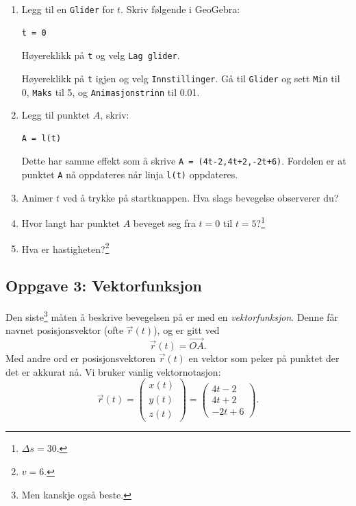 \documentclass[a4paper,12pt]{article}
\begin{document}
\begin{enumerate}[label=\alph*)]
\item Legg til en \lstinline{Glider} for $t$. Skriv følgende i GeoGebra:
\begin{lstlisting}
t = 0
\end{lstlisting}
Høyereklikk på \lstinline{t} og velg \lstinline{Lag glider}.

Høyereklikk på \lstinline{t} igjen og velg \lstinline{Innstillinger}. Gå til \lstinline{Glider} og sett \lstinline{Min} til 0, \lstinline{Maks} til 5, og \lstinline{Animasjonstrinn} til 0.01.

\item Legg til punktet $A$, skriv:
\begin{lstlisting}
A = l(t)
\end{lstlisting}
Dette har samme effekt som å skrive \lstinline{A = (4t-2,4t+2,-2t+6)}. Fordelen er at punktet \lstinline{A} nå oppdateres når linja \lstinline{l(t)} oppdateres.
\item Animer $t$ ved å trykke på startknappen. Hva slags bevegelse observerer du?
\item Hvor langt har punktet $A$ beveget seg fra $t=0$ til $t=5$?\footnote{$\Delta s = 30$.}
\item Hva er hastigheten?\footnote{$v = 6$.}
\end{enumerate}

\subsection*{Oppgave 3: Vektorfunksjon}

Den siste\footnote{Men kanskje også beste.} måten å beskrive bevegelsen på er med en \textit{vektorfunksjon}. Denne får navnet posisjonsvektor (ofte $\vec r(t)$), og er gitt ved
\[\vec r(t) = \overrightarrow{OA}.\]
Med andre ord er posisjonsvektoren $\vec r (t)$ en vektor som peker på punktet der det er akkurat nå. Vi bruker vanlig vektornotasjon:
\[
\vec r(t) = 
\begin{pmatrix}
x(t) \\
y(t) \\
z(t)
\end{pmatrix} =
\begin{pmatrix}
4t-2 \\
4t+2 \\
-2t+6
\end{pmatrix}.
\]
\end{document}
